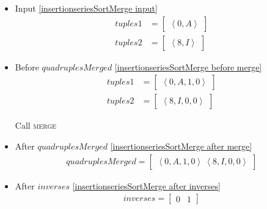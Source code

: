 \begin{frame}[containsverbatim]{\insertionseriesexampleframe}
\begin{columns}[c]
                \begin{column}{0.65\textwidth}
                    \vspace{-0.3cm}
                    \tiny
                    \begin{multicols}{2}
                        \begin{itemize}
                            \item Input \cref{insertionseriesSortMerge input}
                            \begin{align*}
                                tuples1 & = \begin{bmatrix}\left<0, A\right>\end{bmatrix} \\
                                tuples2 & = \begin{bmatrix}\left<8, I\right>\end{bmatrix}
                            \end{align*}

                            \item Before $quadruplesMerged$ \cref{insertionseriesSortMerge before merge}
                            \begin{align*}
                                tuples1 & = \begin{bmatrix}\left<0, A, 1, 0\right>\end{bmatrix} \\
                                tuples2 & = \begin{bmatrix}\left<8, I, 0, 0\right>\end{bmatrix}
                            \end{align*}

                            Call \textsc{merge}

                            \item After $quadruplesMerged$ \cref{insertionseriesSortMerge after merge}
                            \begin{align*}
                                quadruplesMerged = \begin{bmatrix}\left<0, A, 1, 0\right> \ \left<8, I, 0, 0\right>\end{bmatrix}
                            \end{align*}

                            \item After $inverses$ \cref{insertionseriesSortMerge after inverses}
                            \begin{align*}
                                inverses = \begin{bmatrix}0 & 1\end{bmatrix}
                            \end{align*}


\end{itemize}
\end{multicols}
\end{column}
\end{columns}
\end{frame}
